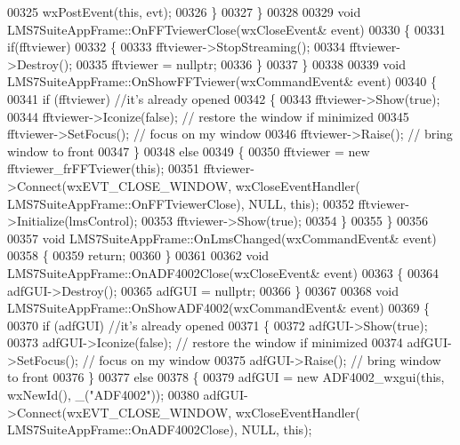 \begin{DoxyCode}
{{{{00325         wxPostEvent(\textcolor{keyword}{this}, evt);
00326     \}
00327 \}
00328 
00329 \textcolor{keywordtype}{void} LMS7SuiteAppFrame::OnFFTviewerClose(wxCloseEvent& event)
00330 \{
00331     \textcolor{keywordflow}{if}(fftviewer)
00332     \{
00333         fftviewer->StopStreaming();
00334         fftviewer->Destroy();
00335         fftviewer = \textcolor{keyword}{nullptr};
00336     \}
00337 \}
00338 
00339 \textcolor{keywordtype}{void} LMS7SuiteAppFrame::OnShowFFTviewer(wxCommandEvent& event)
00340 \{
00341     \textcolor{keywordflow}{if} (fftviewer) \textcolor{comment}{//it's already opened}
00342     \{
00343         fftviewer->Show(\textcolor{keyword}{true});
00344         fftviewer->Iconize(\textcolor{keyword}{false}); \textcolor{comment}{// restore the window if minimized}
00345         fftviewer->SetFocus();  \textcolor{comment}{// focus on my window}
00346         fftviewer->Raise();  \textcolor{comment}{// bring window to front}
00347     \}
00348     \textcolor{keywordflow}{else}
00349     \{
00350         fftviewer = \textcolor{keyword}{new} fftviewer_frFFTviewer(\textcolor{keyword}{this});
00351         fftviewer->Connect(wxEVT\_CLOSE\_WINDOW, wxCloseEventHandler(
      LMS7SuiteAppFrame::OnFFTviewerClose), NULL, \textcolor{keyword}{this});
00352         fftviewer->Initialize(lmsControl);
00353         fftviewer->Show(\textcolor{keyword}{true});
00354     \}
00355 \}
00356 
00357 \textcolor{keywordtype}{void} LMS7SuiteAppFrame::OnLmsChanged(wxCommandEvent& event)
00358 \{
00359     \textcolor{keywordflow}{return};
00360 \}
00361 
00362 \textcolor{keywordtype}{void} LMS7SuiteAppFrame::OnADF4002Close(wxCloseEvent& event)
00363 \{
00364     adfGUI->Destroy();
00365     adfGUI = \textcolor{keyword}{nullptr};
00366 \}
00367 
00368 \textcolor{keywordtype}{void} LMS7SuiteAppFrame::OnShowADF4002(wxCommandEvent& event)
00369 \{
00370     \textcolor{keywordflow}{if} (adfGUI) \textcolor{comment}{//it's already opened}
00371     \{
00372         adfGUI->Show(\textcolor{keyword}{true});
00373         adfGUI->Iconize(\textcolor{keyword}{false}); \textcolor{comment}{// restore the window if minimized}
00374         adfGUI->SetFocus();  \textcolor{comment}{// focus on my window}
00375         adfGUI->Raise();  \textcolor{comment}{// bring window to front}
00376     \}
00377     \textcolor{keywordflow}{else}
00378     \{
00379         adfGUI = \textcolor{keyword}{new} ADF4002_wxgui(\textcolor{keyword}{this}, wxNewId(), \_(\textcolor{stringliteral}{"ADF4002"}));
00380         adfGUI->Connect(wxEVT\_CLOSE\_WINDOW, wxCloseEventHandler(
      LMS7SuiteAppFrame::OnADF4002Close), NULL, \textcolor{keyword}{this});
}}}}
\end{DoxyCode}
